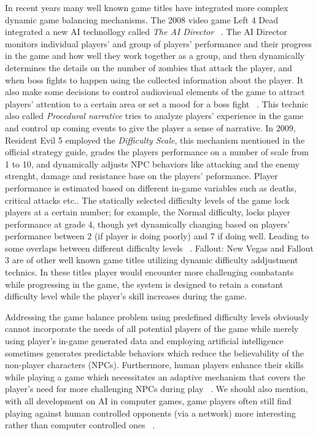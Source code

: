 In recent years many well known game titles have integrated more complex dynamic game balancing mechanisms. The 2008 video game Left 4 Dead integrated a new AI technollogy called \textit{The AI Director} ~\cite{left2008dead}. The AI Director monitors individual players' and group of players' performance and their progress in the game and how well they work together as a group, and then dynamically determines the details on the number of zombies that attack the player, and when boss fights to happen using the collected information about the player. It also make some decisions to control audiovisual elements of the game to attract players' attention to a certain area or set a mood for a boss fight ~\cite{left4dead2009handson}. This technic also called \textit{Procedural narrative} tries to analyze players' experience in the game and control up coming events to give the player a sense of narrative. In 2009, Resident Evil 5 employed the \textit{Difficulty Scale}, this mechanism mentioned in the official strategy guide, grades the players performance on a number of scale from 1 to 10, and dynamically adjusts NPC behaviors like attacking and the enemy strenght, damage and resistance base on the players' peformance. Player performance is estimated based on different in-game variables such as deaths, critical attacks etc.. The statically selected difficulty levels of the game lock players at a certain number; for example, the Normal difficulty, locks player performance at grade 4, though yet dynamically changing based on players' performance between 2 (if player is doing poorly) and 7 if doing well. Leading to some overlaps between different difficulty levels ~\cite{resident2009evil}. Fallout: New Vegas and Fallout 3 are of other well known game titles utilizing dynamic difficulty addjustment technics. In these titles player would encounter more challenging combatants while progressing in the game, the system is designed to retain a constant difficulty level while the player's skill increases during the game.

Addressing the game balance problem using predefined difficulty levels obviously cannot incorporate the needs of all potential players of the game while merely using player's in-game generated data and employing artificial intelligence sometimes generates predictable behaviors which reduce the believability of the non-player characters (NPCs). Furthermore, human players enhance their skills while playing a game which necessitates an adaptive mechanism that covers the player's need for more challenging NPCs during play ~\cite{olesen2008real}. We should also mention, with all development on AI in computer games, game players often still find playing against human controlled opponents (via a network) more interesting rather than computer controlled ones ~\cite{weibel2008playing}.


